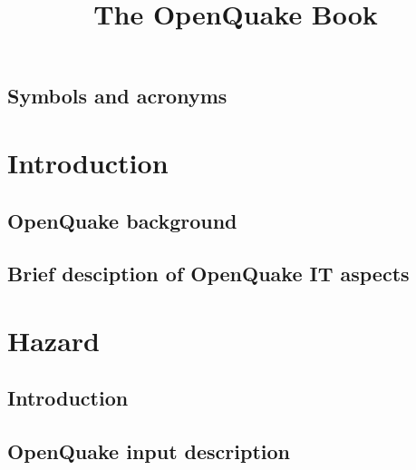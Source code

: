 \documentclass[12pt,a4paper,smallheadings]{scrbook}
\begin{document}
\begin{titlepage}
	\titlehead{\emph{``OpenQuake: Shaken not stirred''}}
	\title{ \textcolor{blue01}{\textsf{\bfseries\Huge The OpenQuake Book}}  }
\end{titlepage}

\pagestyle{scrheadings}
\maketitle
\tableofcontents
%
\chapter*{Symbols and acronyms}
	
\part{Introduction}
\chapter{OpenQuake background}
	
\chapter{Brief desciption of OpenQuake IT aspects}
	
\part{Hazard}
\chapter{Introduction}
	
\chapter{OpenQuake input description}
	
\end{document}
